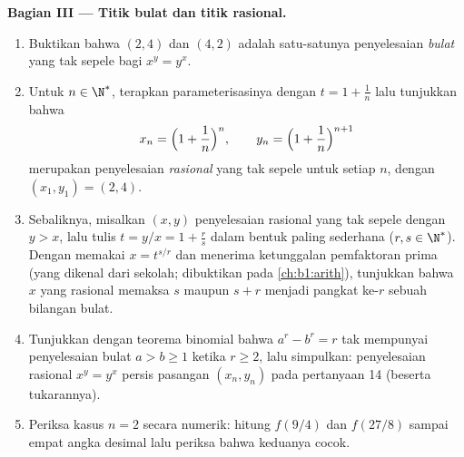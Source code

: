 \begin{problem}
\medskip
\noindent\textbf{Bagian III --- Titik bulat dan titik rasional.}
\begin{enumerate}[resume]
  \item Buktikan bahwa $(2, 4)$ dan $(4, 2)$ adalah satu-satunya penyelesaian
        \emph{bulat} yang tak sepele bagi $x^y = y^x$.
  \item Untuk $n \in \N^*$, terapkan parameterisasinya dengan $t = 1 +
        \frac1n$ lalu tunjukkan bahwa
        \[
        x_n = \Bigl(1 + \frac1n\Bigr)^{n},
        \qquad
        y_n = \Bigl(1 + \frac1n\Bigr)^{n+1}
        \]
        merupakan penyelesaian \emph{rasional} yang tak sepele untuk setiap $n$,
        dengan $(x_1, y_1) = (2, 4)$.
  \item Sebaliknya, misalkan $(x, y)$ penyelesaian rasional yang tak sepele
        dengan $y > x$, lalu tulis $t = y/x = 1 + \frac rs$ dalam bentuk paling
        sederhana ($r, s \in \N^*$). Dengan memakai $x = t^{s/r}$ dan menerima
        ketunggalan pemfaktoran prima (yang dikenal dari
        sekolah; dibuktikan pada \cref{ch:b1:arith}), tunjukkan bahwa $x$
        yang rasional memaksa $s$ maupun $s + r$ menjadi pangkat ke-$r$
        sebuah bilangan bulat.
  \item Tunjukkan dengan teorema binomial bahwa $a^r - b^r = r$ tak mempunyai
        penyelesaian bulat $a > b \geq 1$ ketika $r \geq 2$, lalu
        simpulkan: penyelesaian rasional $x^y = y^x$ persis
        pasangan $(x_n, y_n)$ pada pertanyaan 14 (beserta
        tukarannya).
  \item Periksa kasus $n = 2$ secara numerik: hitung $f(9/4)$ dan
        $f(27/8)$ sampai empat angka desimal lalu periksa bahwa keduanya cocok.
\end{enumerate}


\end{problem}

